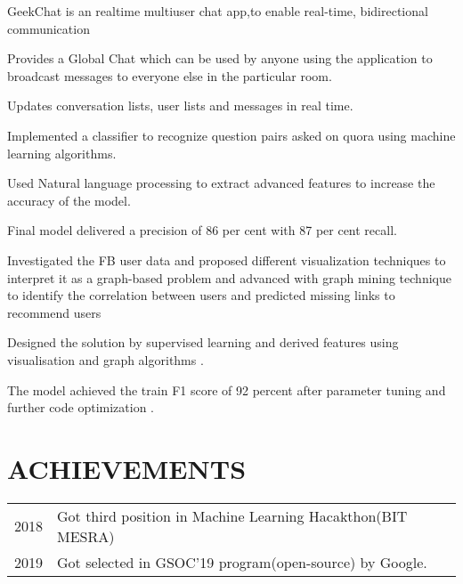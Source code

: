 \documentclass[]{deedy-resume-openfont}
\begin{document}
\begin{minipage}[t]{0.66\textwidth}
GeekChat is an realtime multiuser chat app,to enable real-time, bidirectional communication
\begin{tightemize}
\item Provides a Global Chat which can be used by anyone using the application to
broadcast messages to everyone else in the particular room.
\item Updates conversation lists, user lists and messages in real time.
\end{tightemize}
\sectionsep

Implemented a classifier to recognize question pairs asked on quora using machine
learning algorithms.
\begin{tightemize}
\item Used Natural language processing to extract advanced features to increase the
accuracy of the model.
\item Final model delivered a precision of 86 per cent with 87 per cent recall.
\end{tightemize}
\sectionsep


Investigated the FB user data and proposed different visualization techniques to
interpret it as a graph-based problem and advanced with graph mining technique to
identify the correlation between users and predicted missing links to recommend
users
\begin{tightemize}
\item Designed the solution by supervised learning and derived features using
visualisation and graph algorithms .
\item The model achieved the train F1 score of 92 percent after parameter tuning
and further code optimization .
\end{tightemize}
\sectionsep



\section{ACHIEVEMENTS} 
\begin{tabular}{rll}
2018	    & Got third position in Machine Learning Hacakthon(BIT MESRA)\\
2019        & Got selected in GSOC'19 program(open-source) by Google.
\end{tabular}
\sectionsep



\end{minipage} 
\end{document}
